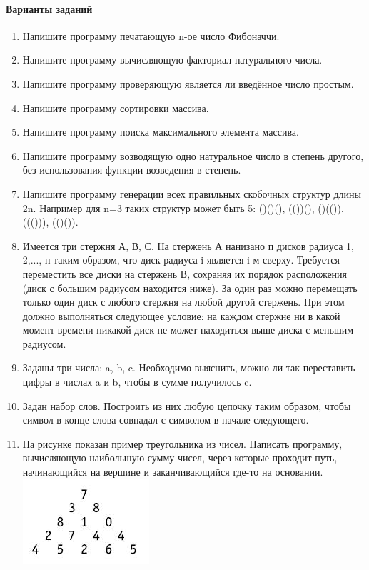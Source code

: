 \documentclass[a4paper,12pt]{article}
\begin{document}
\paragraph{Варианты заданий}
\begin{enumerate}
	\item Напишите программу печатающую n-ое число Фибоначчи.
	\item Напишите программу вычисляющую факториал натурального числа.
	\item Напишите программу проверяющую является ли введённое число простым.
	\item Напишите программу сортировки массива.
	\item Напишите программу поиска максимального элемента массива.
	\item Напишите программу возводящую одно натуральное число в степень другого, без использования функции возведения в степень.
	\item Напишите программу генерации всех правильных скобочных структур длины 2n. Например для n=3 таких структур может быть 5: ()()(), (())(), ()(()), ((())), (()()).
	\item Имеется три стержня А, В, С. На стержень А нанизано п дисков радиуса 1, 2,..., п таким образом, что диск радиуса i является i-м сверху. Требуется переместить все диски на стержень В, сохраняя их порядок расположения (диск с большим радиусом находится ниже). За один раз можно перемещать только один диск с любого стержня на любой другой стержень. При этом должно выполняться следующее условие: на каждом стержне ни в какой момент времени никакой диск не может находиться выше диска с меньшим радиусом. 
	\item Заданы три числа: a, b, c. Необходимо выяснить, можно ли так переставить цифры в числах a и b, чтобы в сумме получилось c.
	\item Задан набор слов. Построить из них любую цепочку таким образом, чтобы символ в конце слова совпадал с символом в начале следующего.
	\item На рисунке показан пример треугольника из чисел. Написать программу, вычисляющую наибольшую сумму чисел, через которые проходит путь, начинающийся на вершине и заканчивающийся где-то на основании. 	
			\includegraphics[scale=1.00]{images/image1.jpg}
		
\end{enumerate}
\end{document}
